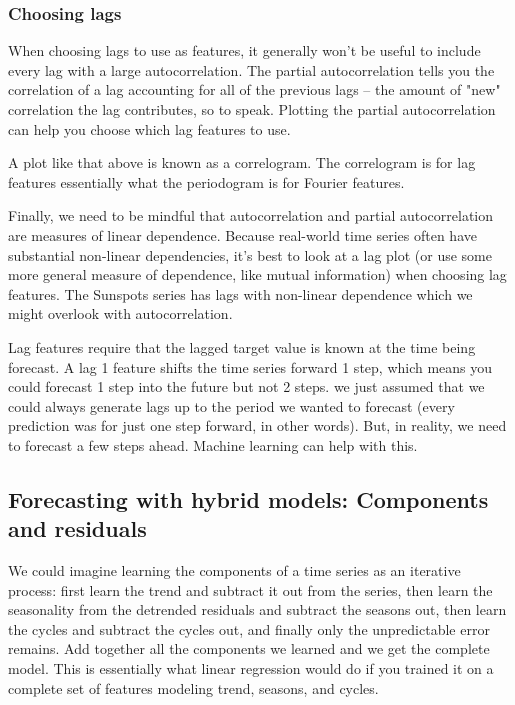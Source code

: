 \documentclass[12pt]{report}
\begin{document}
\subsubsection{Choosing lags}
When choosing lags to use as features, it generally won't be useful to include every lag with a large autocorrelation. The partial autocorrelation tells you the correlation of a lag accounting for all of the previous lags -- the amount of "new" correlation the lag contributes, so to speak. Plotting the partial autocorrelation can help you choose which lag features to use.

A plot like that above is known as a correlogram. The correlogram is for lag features essentially what the periodogram is for Fourier features.

Finally, we need to be mindful that autocorrelation and partial autocorrelation are measures of linear dependence. Because real-world time series often have substantial non-linear dependencies, it's best to look at a lag plot (or use some more general measure of dependence, like mutual information) when choosing lag features. The Sunspots series has lags with non-linear dependence which we might overlook with autocorrelation.

Lag features require that the lagged target value is known at the time being forecast. A lag 1 feature shifts the time series forward 1 step, which means you could forecast 1 step into the future but not 2 steps. we just assumed that we could always generate lags up to the period we wanted to forecast (every prediction was for just one step forward, in other words). But, in reality, we need to forecast a few steps ahead. Machine learning can help with this.



\subsection{Forecasting with hybrid models: Components and residuals}

We could imagine learning the components of a time series as an iterative process: first learn the trend and subtract it out from the series, then learn the seasonality from the detrended residuals and subtract the seasons out, then learn the cycles and subtract the cycles out, and finally only the unpredictable error remains. Add together all the components we learned and we get the complete model. This is essentially what linear regression would do if you trained it on a complete set of features modeling trend, seasons, and cycles.
\end{document}
